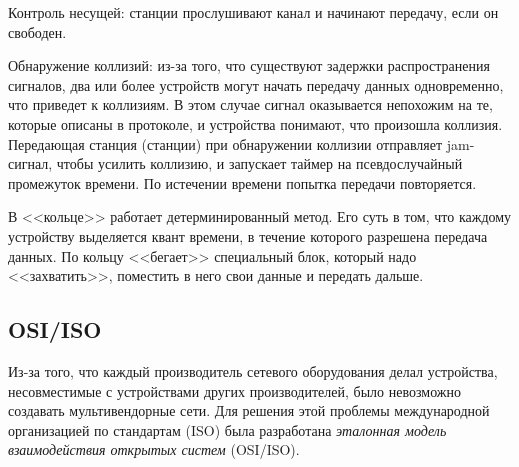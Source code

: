 Контроль несущей: станции прослушивают канал и начинают передачу, если он свободен.


Обнаружение коллизий: из-за того, что существуют задержки распространения сигналов, два или более устройств могут начать передачу данных одновременно, что приведет к коллизиям. В этом случае сигнал оказывается непохожим на те, которые описаны в протоколе, и устройства понимают, что произошла коллизия. Передающая станция (станции) при обнаружении коллизии отправляет jam-сигнал, чтобы усилить коллизию, и запускает таймер на псевдослучайный промежуток времени. По истечении времени попытка передачи повторяется.

В <<кольце>> работает детерминированный метод. Его суть в том, что каждому устройству выделяется квант времени, в течение которого разрешена передача данных. По кольцу <<бегает>> специальный блок, который надо <<захватить>>, поместить в него свои данные и передать дальше.

\subsection{OSI/ISO}

Из-за того, что каждый производитель сетевого оборудования делал устройства, несовместимые с устройствами других производителей, было невозможно создавать мультивендорные сети. Для решения этой проблемы международной организацией по стандартам (ISO) была разработана \textit{эталонная модель взаимодействия открытых систем} (OSI/ISO).

